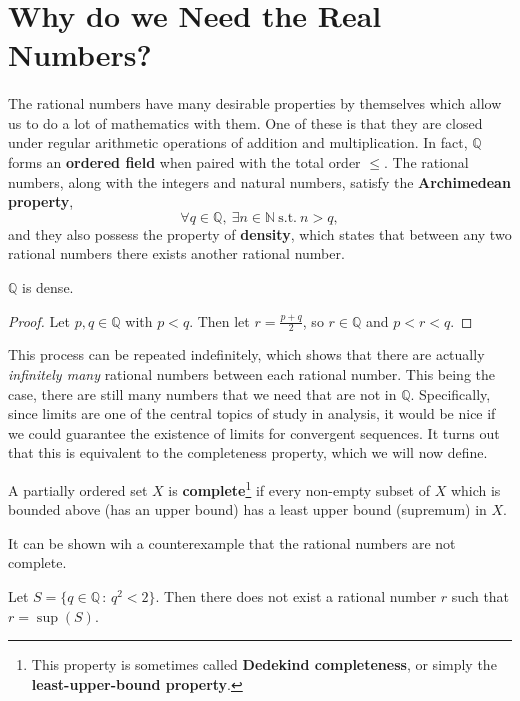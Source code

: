 \documentclass[../real_analysis.tex]{subfiles}
\begin{document}
    \section{Why do we Need the Real Numbers?}
        \paragraph{}
        The rational numbers have many desirable properties by themselves which allow us to do a lot of mathematics with them. One of these is that they are closed under regular arithmetic operations of addition and multiplication. In fact, $\mathbb{Q}$ forms an \textbf{ordered field} when paired with the total order $\leq$. The rational numbers, along with the integers and natural numbers, satisfy the \textbf{Archimedean property},
        \[\forall q\in\mathbb{Q},\ \exists n\in\mathbb{N}\ \mathrm{s.t.}\ n>q,\]
        and they also possess the property of \textbf{density}, which states that between any two rational numbers there exists another rational number.
        \begin{theorem}
            $\mathbb{Q}$ is dense.
        \end{theorem}
        \begin{proof}
            Let $p,q\in\mathbb{Q}$ with $p<q$. Then let $r=\frac{p+q}{2}$, so $r\in\mathbb{Q}$ and $p<r<q$.
        \end{proof}
        This process can be repeated indefinitely, which shows that there are actually \textit{infinitely many} rational numbers between each rational number. This being the case, there are still many numbers that we need that are not in $\mathbb{Q}$. Specifically, since limits are one of the central topics of study in analysis, it would be nice if we could guarantee the existence of limits for convergent sequences. It turns out that this is equivalent to the completeness property, which we will now define.
        \begin{definition}
            A partially ordered set $X$ is \textbf{complete}\footnote{This property is sometimes called \textbf{Dedekind completeness}, or simply the \textbf{least-upper-bound property}.} if every non-empty subset of $X$ which is bounded above (has an upper bound) has a least upper bound (supremum) in $X$.
        \end{definition}
        It can be shown wih a counterexample that the rational numbers are not complete.
        \begin{theorem}
            Let $S=\{q\in\mathbb{Q}\,:\,q^2<2\}$. Then there does not exist a rational number $r$ such that $r=\sup(S)$.
        \end{theorem}
\end{document}

